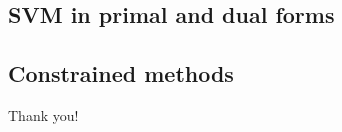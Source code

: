 \documentclass[draft]{beamer}
\newcommand{\chuhao}{\fontsize{44.9pt}{\baselineskip}\selectfont}
\begin{document}
\subsection{SVM in primal and dual forms}
\subsection{Constrained methods} 

%
%

\begin{frame}
\chuhao Thank you! %
\end{frame}
		
	
\end{document}
